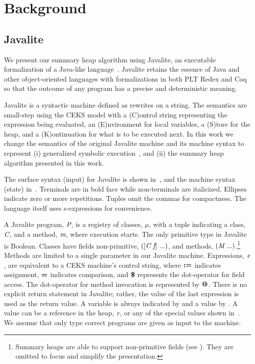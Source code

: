 \section{Background}
\subsection{Javalite}
We present our summary heap algorithm using Javalite, an
executable formalization of a Java-like language~\cite{saints-MS}. Javalite retains 
the essence of Java and other object-oriented languages with formalizations 
in both PLT Redex and Coq so that the outcome of any program has a precise
and deterministic meaning.

Javalite is a syntactic machine defined as rewrites on a string.  The
semantics are small-step using the CEKS model with a (C)ontrol string
representing the expression being evaluated, an (E)nvironment for
local variables, a (S)tore for the heap, and a (K)ontinuation for what
is to be executed next.  In this work we change the semantics of the original
 Javalite machine and its machine syntax to represent (i) generalized
symbolic execution~\cite{GSE03}, and (ii) the summary heap algorithm
presented in this work.

The surface syntax (input) for Javalite is shown 
in~, and the machine syntax (state)
in~. Terminals are in bold face while
non-terminals are italicized. Ellipses indicate zero or more
repetitions. Tuples omit the commas for compactness. The language
itself uses s-expressions for convenience.




A Javalite program, $\emph{P}$, is a registry of classes, $\mu$, with
a tuple indicating a class, $\emph{C}$, and a method, $\emph{m}$,
where execution starts. The only primitive type in Javalite is
Boolean. Classes have fields non-primitive, $([\cfgnt{C}\ \cfgnt{f}]\ ...)$, and
methods, $(\cfgnt{M}\ ...)$.\footnote{Summary heaps are able to support non-primitive fields (see ). They are omitted to focus and simplify the presentation.} Methods are limited to a single
parameter in our Javalite machine. Expressions, $\emph{e}$, are 
equivalent to a CEKS machine's control string, 
where $\textbf{:=}$ indicates assignment, $\textbf{=}$ indicates comparison,
and $\textbf{\$}$ represents the dot-operator for field access. The dot-operator
for method invocation is represented by $\textbf{@}$. There is no explicit return
statement in Javalite; rather, the value of the last expression is
used as the return value. A variable is always indicated by 
and a value by . A value can be a reference in the heap,
$\emph{r}$, or any of the special values shown in~. 
We assume that only
type correct programs are given as input to the machine.

